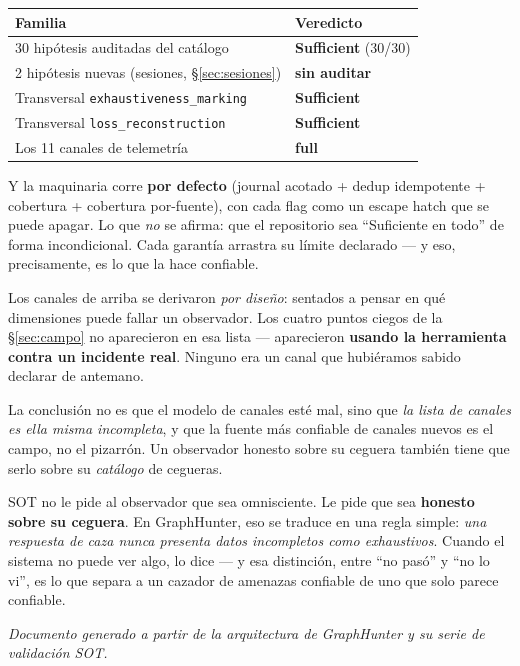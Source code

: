 \documentclass[11pt,a4paper]{article}
\newcommand{\code}[1]{\texttt{\small #1}}
\begin{document}
\begin{center}
\renewcommand{\arraystretch}{1.3}
\begin{tabular}{@{}p{6.5cm}p{4cm}@{}}
\toprule
\textbf{Familia} & \textbf{Veredicto} \\
\midrule
30 hipótesis auditadas del catálogo & \textcolor{ghgreen}{\textbf{Sufficient}} (30/30) \\
2 hipótesis nuevas (sesiones, \S\ref{sec:sesiones}) & \textcolor{ghamber}{\textbf{sin auditar}} \\
Transversal \code{exhaustiveness\_marking} & \textcolor{ghgreen}{\textbf{Sufficient}} \\
Transversal \code{loss\_reconstruction} & \textcolor{ghgreen}{\textbf{Sufficient}} \\
Los 11 canales de telemetría & \textcolor{ghgreen}{\textbf{full}} \\
\bottomrule
\end{tabular}
\end{center}

Y la maquinaria corre \textbf{por defecto} (journal acotado + dedup idempotente
+ cobertura + cobertura por-fuente), con cada flag como un escape hatch que se
puede apagar. Lo que \emph{no} se afirma: que el repositorio sea ``Suficiente
en todo'' de forma incondicional. Cada garantía arrastra su límite declarado
--- y eso, precisamente, es lo que la hace confiable.

\begin{warnbox}
Los canales de arriba se derivaron \emph{por diseño}: sentados a pensar en qué
dimensiones puede fallar un observador. Los cuatro puntos ciegos de la
\S\ref{sec:campo} no aparecieron en esa lista --- aparecieron \textbf{usando la
herramienta contra un incidente real}. Ninguno era un canal que hubiéramos
sabido declarar de antemano.

La conclusión no es que el modelo de canales esté mal, sino que \emph{la lista
de canales es ella misma incompleta}, y que la fuente más confiable de canales
nuevos es el campo, no el pizarrón. Un observador honesto sobre su ceguera
también tiene que serlo sobre su \emph{catálogo} de cegueras.
\end{warnbox}

\begin{keybox}
SOT no le pide al observador que sea omnisciente. Le pide que sea
\textbf{honesto sobre su ceguera}. En GraphHunter, eso se traduce en una regla
simple: \emph{una respuesta de caza nunca presenta datos incompletos como
exhaustivos}. Cuando el sistema no puede ver algo, lo dice --- y esa
distinción, entre ``no pasó'' y ``no lo vi'', es lo que separa a un cazador de
amenazas confiable de uno que solo parece confiable.
\end{keybox}

\vfill
\begin{center}
\small\color{ghgray}\emph{Documento generado a partir de la arquitectura de
GraphHunter y su serie de validación SOT.}
\end{center}
\end{document}
